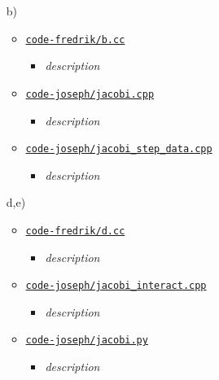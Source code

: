 \documentclass[11pt,a4paper]{article}
\begin{document}
\begin{enumerate}
  \item[b)]
  \begin{itemize}
    \item \href{https://github.com/frxstrem/fys3150/tree/master/project2/code-fredrik/b.cc}{\tt code-fredrik/b.cc}
    \begin{itemize}
      \item {\it description}
    \end{itemize}
    \item \href{https://github.com/frxstrem/fys3150/tree/master/project2/code-joseph/jacobi.cpp}{\tt code-joseph/jacobi.cpp}
    \begin{itemize}
      \item {\it description}
    \end{itemize}
    \item \href{https://github.com/frxstrem/fys3150/tree/master/project2/code-joseph/jacobi_step_data.cpp}{\tt code-joseph/jacobi\_step\_data.cpp}
    \begin{itemize}
      \item {\it description}
    \end{itemize}
  \end{itemize}

  \item[d,e)]
  \begin{itemize}
    \item \href{https://github.com/frxstrem/fys3150/tree/master/project2/code-fredrik/d.cc}{\tt code-fredrik/d.cc}
    \begin{itemize}
      \item {\it description}
    \end{itemize}
    \item \href{https://github.com/frxstrem/fys3150/tree/master/project2/code-joseph/jacobi_interact.cpp}{\tt code-joseph/jacobi\_interact.cpp}
    \begin{itemize}
      \item {\it description}
    \end{itemize}
    \item \href{https://github.com/frxstrem/fys3150/tree/master/project2/code-joseph/jacobi.py}{\tt code-joseph/jacobi.py}
    \begin{itemize}
      \item {\it description}
    \end{itemize}
  \end{itemize}
\end{enumerate}

\clearpage

\printbibliography[heading=bibnumbered,title=Bibliography]
\end{document}
